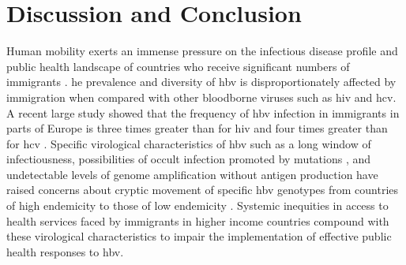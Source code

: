 \section{Discussion and Conclusion}
Human mobility exerts an immense pressure on the infectious disease profile and public health landscape of countries who receive significant numbers of immigrants \citep{thijssen2019mass}.
he prevalence and diversity of \gls{hbv} is disproportionately affected by immigration when compared with other bloodborne viruses such as \gls{hiv} and \gls{hcv}.
A recent large study showed that the frequency of \gls{hbv} infection in immigrants in parts of Europe is three times greater than for \gls{hiv} and four times greater than for \gls{hcv} \citep{gonzalez2020overt}.
Specific virological characteristics of \gls{hbv} such as a long window of infectiousness, possibilities of occult infection promoted by mutations \citep{pronier2020contribution,olusola2021profiles,raimondo2019update}, and undetectable levels of genome amplification without antigen production have raised concerns about cryptic movement of specific \gls{hbv} genotypes from countries of high endemicity to those of low endemicity \citep{azarkar2019epidemiology,zhu2016genetic,bedi2021occult}.
Systemic inequities in access to health services faced by immigrants in higher income countries \citep{smith2018migrant} compound with these virological characteristics to impair the implementation of effective public health responses to \gls{hbv}.

